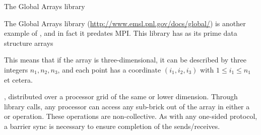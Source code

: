 
 {The Global Arrays library}

The Global Arrays library (\url{http://www.emsl.pnl.gov/docs/global/})
is another example of , and in fact
it predates MPI. This library has as its prime data structure
 arrays
\begin{footnoteenv}
  {This means that if the
  array is three-dimensional, it can be described by three integers
  $n_1,n_2,n_3$, and each point has a coordinate $(i_1,i_2,i_3)$ with
  $1\leq i_1\leq n_1$ et cetera.}
\end{footnoteenv}
, distributed over a processor grid
of the same or lower dimension. Through library calls, any processor
can access any sub-brick out of the array in either a  or
 operation. These operations are non-collective. As with any
one-sided protocol, a barrier sync is necessary to ensure completion
of the sends/receives.



